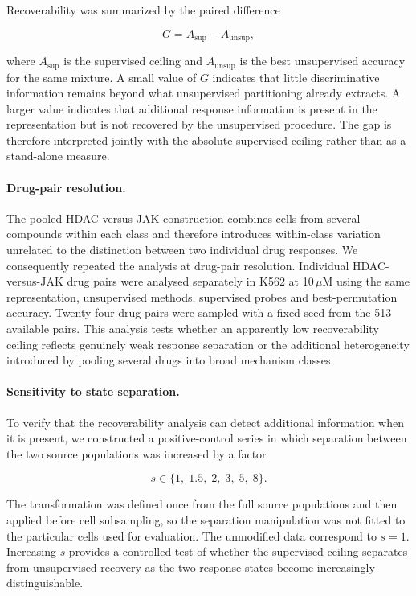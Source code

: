 \documentclass[11pt,letterpaper]{article}
\begin{document}
Recoverability was summarized by the paired difference

$$
G
=
A_{\mathrm{sup}}
-
A_{\mathrm{unsup}},
$$

where $A_{\mathrm{sup}}$ is the supervised ceiling and $A_{\mathrm{unsup}}$ is the best
unsupervised accuracy for the same mixture. A small value of $G$ indicates that little
discriminative information remains beyond what unsupervised partitioning already extracts. A
larger value indicates that additional response information is present in the representation but
is not recovered by the unsupervised procedure. The gap is therefore interpreted jointly with the
absolute supervised ceiling rather than as a stand-alone measure.

\paragraph{Drug-pair resolution.}
The pooled HDAC-versus-JAK construction combines cells from several compounds within each class and
therefore introduces within-class variation unrelated to the distinction between two individual
drug responses. We consequently repeated the analysis at drug-pair resolution. Individual
HDAC-versus-JAK drug pairs were analysed separately in K562 at 10\,$\mu$M using the same
representation, unsupervised methods, supervised probes and best-permutation accuracy. Twenty-four
drug pairs were sampled with a fixed seed from the 513 available pairs. This analysis tests whether
an apparently low recoverability ceiling reflects genuinely weak response separation or the
additional heterogeneity introduced by pooling several drugs into broad mechanism classes.

\paragraph{Sensitivity to state separation.}
To verify that the recoverability analysis can detect additional information when it is present,
we constructed a positive-control series in which separation between the two source populations
was increased by a factor

$$
s
\in
\{1,\;1.5,\;2,\;3,\;5,\;8\}.
$$

The transformation was defined once from the full source populations and then applied before cell
subsampling, so the separation manipulation was not fitted to the particular cells used for
evaluation. The unmodified data correspond to $s=1$. Increasing $s$ provides a controlled test of
whether the supervised ceiling separates from unsupervised recovery as the two response states
become increasingly distinguishable.
\end{document}
